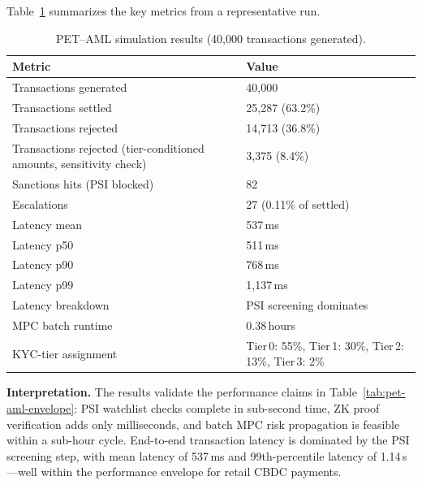 \documentclass[11pt]{article}
\begin{document}
Table~\ref{tab:sim-results} summarizes the key metrics from a representative run.

\begin{table}[H]
\centering
\caption{PET--AML simulation results (40{,}000 transactions generated).}
\label{tab:sim-results}
\begin{tabular}{p{4.8cm} p{3.0cm}}
\toprule
\textbf{Metric} & \textbf{Value} \\
\midrule
Transactions generated       & 40{,}000 \\
Transactions settled         & 25{,}287 (63.2\%) \\
Transactions rejected        & 14{,}713 (36.8\%) \\
Transactions rejected (tier-conditioned amounts, sensitivity check) & 3{,}375 (8.4\%) \\
Sanctions hits (PSI blocked) & 82 \\
Escalations                  & 27 (0.11\% of settled) \\
\addlinespace
Latency mean                 & 537\,ms \\
Latency p50                  & 511\,ms \\
Latency p90                  & 768\,ms \\
Latency p99                  & 1{,}137\,ms \\
\addlinespace
Latency breakdown            & PSI screening dominates \\
MPC batch runtime            & 0.38\,hours \\
\addlinespace
KYC-tier assignment          & Tier\,0: 55\%, Tier\,1: 30\%, Tier\,2: 13\%, Tier\,3: 2\% \\
\bottomrule
\end{tabular}
\end{table}

\textbf{Interpretation.} The results validate the performance claims in Table~\ref{tab:pet-aml-envelope}: PSI watchlist checks complete in sub-second time, ZK proof verification adds only milliseconds, and batch MPC risk propagation is feasible within a sub-hour cycle. End-to-end transaction latency is dominated by the PSI screening step, with mean latency of 537\,ms and 99th-percentile latency of 1.14\,s---well within the performance envelope for retail CBDC payments.
\end{document}
